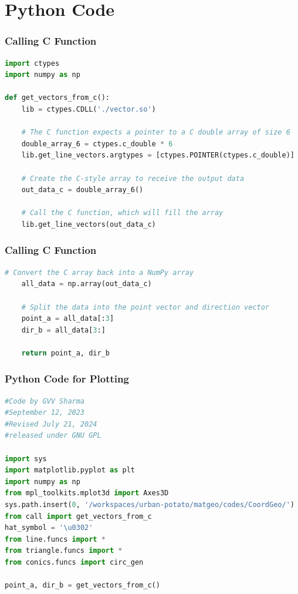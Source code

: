 \documentclass{beamer}
\theoremstyle{remark}
\numberwithin{equation}{section}
\begin{document}
\section{Python Code}
\begin{frame}[fragile]
\frametitle{Calling C Function}
\begin{lstlisting}[language=Python]
import ctypes
import numpy as np

def get_vectors_from_c():
    lib = ctypes.CDLL('./vector.so')

    # The C function expects a pointer to a C double array of size 6
    double_array_6 = ctypes.c_double * 6
    lib.get_line_vectors.argtypes = [ctypes.POINTER(ctypes.c_double)]
    
    # Create the C-style array to receive the output data
    out_data_c = double_array_6()
    
    # Call the C function, which will fill the array
    lib.get_line_vectors(out_data_c)
\end{lstlisting}
\end{frame}
\begin{frame}[fragile]
\frametitle{Calling C Function}
\begin{lstlisting}[language=Python]
# Convert the C array back into a NumPy array
    all_data = np.array(out_data_c)
    
    # Split the data into the point vector and direction vector
    point_a = all_data[:3]
    dir_b = all_data[3:]
    
    return point_a, dir_b
    \end{lstlisting}
\end{frame}
\begin{frame}[fragile]
\frametitle{Python Code for Plotting}
\begin{lstlisting}[language=Python]
#Code by GVV Sharma
#September 12, 2023
#Revised July 21, 2024
#released under GNU GPL

import sys
import matplotlib.pyplot as plt
import numpy as np
from mpl_toolkits.mplot3d import Axes3D
sys.path.insert(0, '/workspaces/urban-potato/matgeo/codes/CoordGeo/') 
from call import get_vectors_from_c
hat_symbol = '\u0302'
from line.funcs import *
from triangle.funcs import *
from conics.funcs import circ_gen

point_a, dir_b = get_vectors_from_c()
 
\end{lstlisting}
\end{frame}
\end{document}
